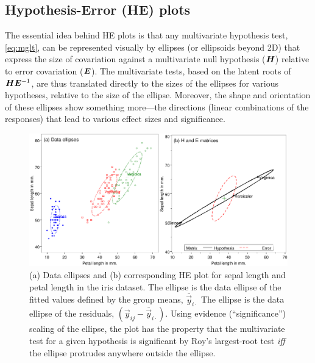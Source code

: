 \subsection{Hypothesis-Error (HE) plots}

The essential idea behind HE plots is that any multivariate hypothesis
test, \eqref{eq:mglt}, can be represented visually by ellipses (or ellipsoids beyond 2D) that express
the size  of covariation against a multivariate null hypothesis
($\bm{H}$) relative to error covariation ($\bm{E}$).
The multivariate tests, based on the latent roots of $\bm{H} \bm{E}^{-1}$,
are thus translated directly to the sizes of the  ellipses for
various hypotheses, relative to the size of the  ellipse.
Moreover, the shape and orientation of these ellipses show something more---the
directions (linear combinations of the responses) that lead to
various effect sizes and significance.

\begin{figure}[htb]
  \centering
  \includegraphics[width=.9\textwidth,clip]{fig/heplot3a}
  \caption{(a) Data ellipses and (b) corresponding HE plot for sepal length and petal length in the iris dataset.
  	The  ellipse is the data ellipse of the fitted values defined by the group means, $\bar{\vec{y}}_{i \cdot}$
  	The  ellipse is the data ellipse of the residuals, $(\vec{y}_{ij} - \bar{\vec{y}}_{i \cdot})$.
  	Using evidence (``significance'') scaling of the  ellipse, the plot has the property that
  	the multivariate test for a given hypothesis is significant by Roy's largest-root test \emph{iff}
  	the  ellipse protrudes anywhere outside the  ellipse.}%
  \label{fig:heplot3a}
\end{figure}

